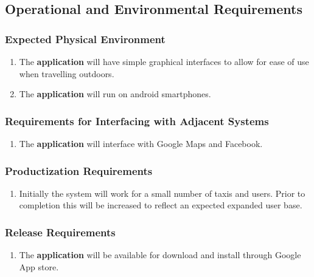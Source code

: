 \documentclass[english]{article}
\begin{document}
\subsection{Operational and Environmental Requirements}
\label{sub:operational_and_environmental_requirements}

\subsubsection{Expected Physical Environment}
\label{ssub:expected_physical_environment}
\begin{enumerate}[{OE}1. ]
	\item The \textbf{application} will have simple graphical interfaces to allow for ease of use when travelling outdoors.
	\item The \textbf{application} will run on android smartphones.
\end{enumerate}

\subsubsection{Requirements for Interfacing with Adjacent Systems}
\label{ssub:requirements_for_interfacing_with_adjacent_systems}
\begin{enumerate}[{OE}1. ]
	\item The \textbf{application} will interface with Google Maps and Facebook.
\end{enumerate}

\subsubsection{Productization Requirements}
\label{ssub:productization_requirements}
\begin{enumerate}[{OE}1. ]
	\item Initially the system will work for a small number of taxis and users. Prior to completion this will be increased to reflect an expected expanded user base.
\end{enumerate}

\subsubsection{Release Requirements}
\label{ssub:release_requirements}
\begin{enumerate}[{OE}1. ]
	\item The \textbf{application} will be available for download and install through Google App store.
\end{enumerate}
\end{document}
